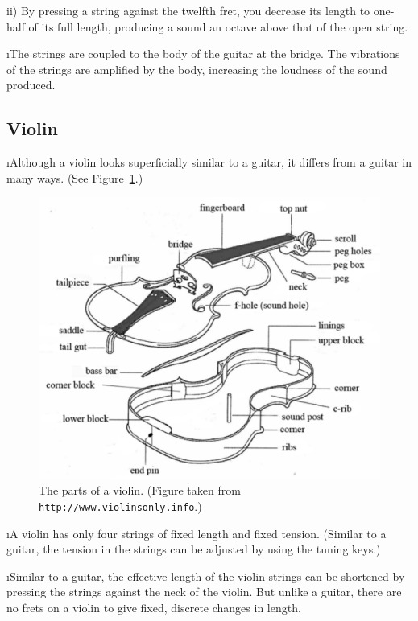 ii) By pressing a string against the twelfth fret,
you decrease its length to one-half of its full
length, producing a sound an octave above that of
the open string.

\i The strings are coupled to the body of the 
guitar at the bridge.
The vibrations of the strings are amplified by
the body, increasing the loudness of the sound 
produced.

\ei
\subsection{Violin}
\bi

\i Although a violin looks superficially similar to a guitar, 
it differs from a guitar in many ways.
(See Figure~\ref{f:violin}.)
%
\begin{figure}[htbp]
\begin{center}
\includegraphics[width=.9\textwidth]{violin.pdf}
\caption{The parts of a violin.
(Figure taken from {\tt http://www.violinsonly.info}.)}
\label{f:violin}
\end{center}
\end{figure}

\i A violin has only four strings of fixed length
and fixed tension.
(Similar to a guitar, 
the tension in the strings can be adjusted
by using the tuning keys.)

\i Similar to a guitar, the effective length of 
the violin strings can be shortened by pressing the 
strings against the neck of the violin.
But unlike a guitar, there are no frets on a violin 
to give fixed, discrete changes in length.

